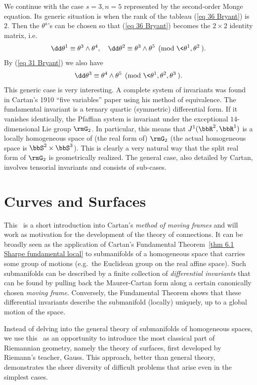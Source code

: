 We continue with the case $s=3,n=5$ represented by the second-order Monge equation. Its generic situation is when the rank of the tableau (\ref{eq 36 Bryant}) is $2$. Then the $\theta^a$'s can be chosen so that (\ref{eq 36 Bryant}) becomes the $2\times 2$ identity matrix, i.e.\ 
\[\dd\theta^1\equiv \theta^3\wedge\theta^4,\quad\dd\theta^2\equiv \theta^3\wedge\theta^5 \pmod{\<\theta^1,\theta^2\>}.\]
By (\ref{eq 31 Bryant}) we also have 
\[\dd\theta^3\equiv \theta^4\wedge\theta^5 \pmod{\<\theta^1,\theta^2,\theta^3\>}.\]
This generic case is very interesting. A complete system of invariants was found in Cartan's 1910 ``five variables'' paper using his method of equivalence. The fundamental invariant is a ternary quartic (symmetric) differential form. If it vanishes identically, the Pfaffian system is invariant under the exceptional $14$-dimensional Lie group $\rmG_2$. In particular, this means that $J^1(\bbR^2,\bbR^1)$ is a locally homogeneous space of (the real form of) $\rmG_2$ (the actual homogeneous space is $\bbS^2\times\bbS^3$). This is clearly a very natural way that the split real form of $\rmG_2$ is geometrically realized. The general case, also detailed by Cartan, involves tensorial invariants and consists of sub-cases.













\section{Curves and Surfaces}


This \sect\ is a short introduction into Cartan's \emph{method of moving frames} and will work as motivation for the development of the theory of connections. It can be broadly seen as the application of Cartan's Fundamental Theorem~\ref{thm 6.1 Sharpe fundamental local} to submanifolds of a homogeneous space that carries some group of motions (e.g.\  the Euclidean group on the real affine space). Such submanifolds can be described by a finite collection of \emph{differential invariants} that can be found by pulling back the Maurer-Cartan form along a certain canonically chosen \emph{moving frame}. Conversely, the Fundamental Theorem shows that these differential invariants describe the submanifold (locally) uniquely, up to a global motion of the space. 

Instead of delving into the general theory of submanifolds of homogeneous spaces, we use this \sect\ as an opportunity to introduce the most classical part of Riemannian geometry, namely the theory of surfaces, first developed by Riemann's teacher, Gauss. This approach, better than general theory, demonstrates the sheer diversity of difficult problems that arise even in the simplest cases.

